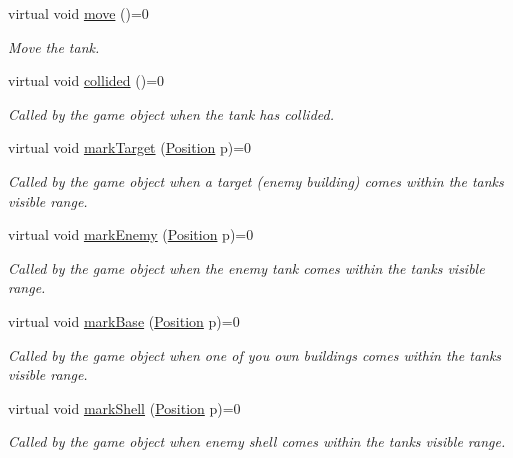 \begin{DoxyCompactItemize}
\mbox{\label{class_a_i_tank_a3d188a008b3c4f7e920bfc4d7ac8d7b9}} 
virtual void \mbox{\hyperlink{class_a_i_tank_a3d188a008b3c4f7e920bfc4d7ac8d7b9}{move}} ()=0
\begin{DoxyCompactList}\small\item\em Move the tank. \end{DoxyCompactList}\item 
\mbox{\label{class_a_i_tank_a5d0274f97e4f2d5cc21eac90300fc67f}} 
virtual void \mbox{\hyperlink{class_a_i_tank_a5d0274f97e4f2d5cc21eac90300fc67f}{collided}} ()=0
\begin{DoxyCompactList}\small\item\em Called by the game object when the tank has collided. \end{DoxyCompactList}\item 
virtual void \mbox{\hyperlink{class_a_i_tank_ae59c2164c71b51eeada7d2f7ef6c6238}{mark\+Target}} (\mbox{\hyperlink{class_position}{Position}} p)=0
\begin{DoxyCompactList}\small\item\em Called by the game object when a target (enemy building) comes within the tanks visible range. \end{DoxyCompactList}\item 
virtual void \mbox{\hyperlink{class_a_i_tank_a2bd0495cee5e50d3ef60b3d6c6c145d8}{mark\+Enemy}} (\mbox{\hyperlink{class_position}{Position}} p)=0
\begin{DoxyCompactList}\small\item\em Called by the game object when the enemy tank comes within the tanks visible range. \end{DoxyCompactList}\item 
virtual void \mbox{\hyperlink{class_a_i_tank_ac6d5bd1dbf2c4ccf3b6437ab17b3c5d9}{mark\+Base}} (\mbox{\hyperlink{class_position}{Position}} p)=0
\begin{DoxyCompactList}\small\item\em Called by the game object when one of you own buildings comes within the tanks visible range. \end{DoxyCompactList}\item 
virtual void \mbox{\hyperlink{class_a_i_tank_abdf630572f1bb4afcd11a711f19a7c65}{mark\+Shell}} (\mbox{\hyperlink{class_position}{Position}} p)=0
\begin{DoxyCompactList}\small\item\em Called by the game object when enemy shell comes within the tanks visible range. \end{DoxyCompactList}\item 

\end{DoxyCompactItemize}
